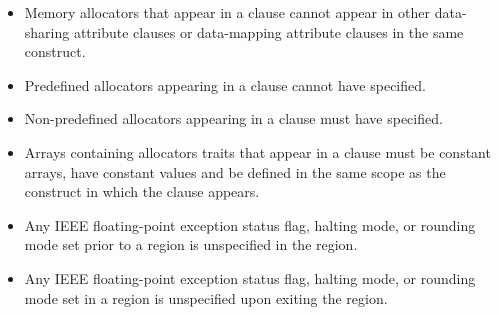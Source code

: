\begin{itemize}
\item Memory allocators that appear in a  clause cannot appear in other data-sharing attribute clauses or data-mapping attribute clauses in the same construct.

\item Predefined allocators appearing in a  clause cannot have  specified.

\item Non-predefined allocators appearing in a  clause must have  specified.

\item Arrays containing allocators traits that appear in a  clause must be constant arrays, have constant values and be defined in the same scope as the construct in which the clause appears. 

\item Any IEEE floating-point exception status flag, halting mode, or rounding mode set prior to a  region is unspecified in the region.

\item Any IEEE floating-point exception status flag, halting mode, or rounding mode set in a  region is unspecified upon exiting the region.





\end{itemize}
